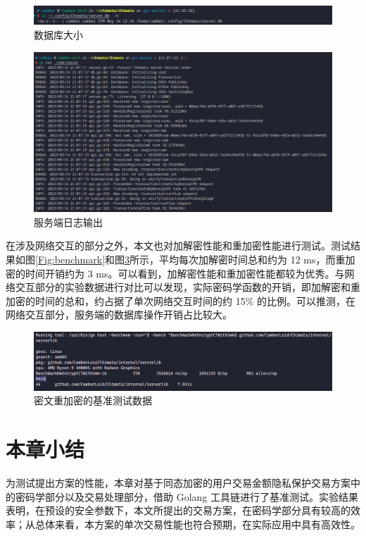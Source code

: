 \begin{figure}
    \centering
    \includegraphics[width=0.8\linewidth]{./Figures/Test_Database_Size.png}
    \caption{数据库大小}\label{Fig:database_size}
\end{figure}

\begin{figure}
    \centering
    \includegraphics[width=0.8\linewidth]{./Figures/Server_ReceiptPK.png}
    \caption{服务端日志输出}\label{Fig:server}
\end{figure}


在涉及网络交互的部分之外，本文也对加解密性能和重加密性能进行测试。测试结果如图\ref{Fig:benchmark}和图\ref{Fig:bench_reencrypt}所示，平均每次加解密时间总和约为 12 ms，而重加密的时间开销约为 3 ms。可以看到，加解密性能和重加密性能都较为优秀。与网络交互部分的实验数据进行对比可以发现，实际密码学函数的开销，即加解密和重加密的时间的总和，约占据了单次网络交互时间的约 15\% 的比例。可以推测，在网络交互部分，服务端的数据库操作开销占比较大。

\begin{figure}[h]
    \centering
    \includegraphics[width=0.8\linewidth]{./Figures/Bench_ReEncrypt.png}
    \caption{密文重加密的基准测试数据}\label{Fig:bench_reencrypt}
\end{figure}

\pagebreak

\pagebreak

\section{本章小结}

为测试提出方案的性能，本章对基于同态加密的用户交易金额隐私保护交易方案中的密码学部分以及交易处理部分，借助 Golang 工具链进行了基准测试。实验结果表明，在预设的安全参数下，本文所提出的交易方案，在密码学部分具有较高的效率；从总体来看，本方案的单次交易性能也符合预期，在实际应用中具有高效性。
